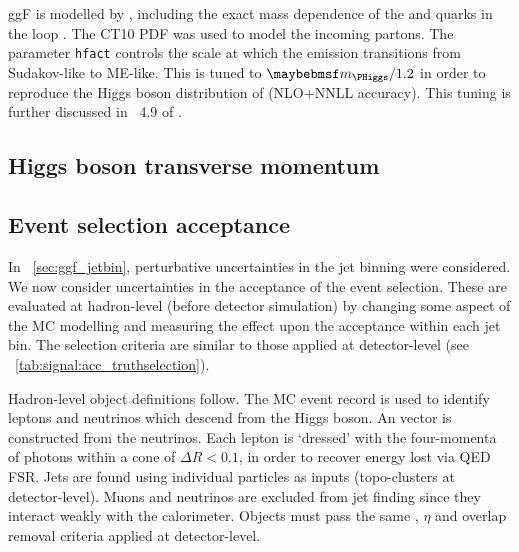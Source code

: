 
ggF is modelled by , including the exact mass 
dependence of the \Ptop and \Pbottom quarks in the loop \cite{Powheg-ggF-quarkmasses}. 
The CT10 PDF \cite{CTEQ} was used to model the incoming partons.
The \powhegbox parameter \verb|hfact| controls the scale at which the emission 
transitions from Sudakov-like to ME-like. This is tuned to $\mH/1.2$ in order to 
reproduce the Higgs boson \pt distribution of \hqt \cite{HqT2} (NLO+NNLL accuracy). This 
tuning is further discussed in \Section~4.9 of \Reference \cite{YR2}.



\subsection{Higgs boson transverse momentum}



\subsection{Event selection acceptance}

In \Section~\ref{sec:ggf_jetbin}, perturbative uncertainties in the jet binning were 
considered. We now consider uncertainties in the acceptance of the event selection. These 
are evaluated at hadron-level (\ie before detector simulation) by changing some aspect of 
the MC modelling and measuring the effect upon the acceptance within each jet bin. 
The selection criteria are similar to those applied at detector-level (see 
\Table~\ref{tab:signal:acc_truthselection}).

Hadron-level object definitions follow. The MC event record is used to identify leptons 
and neutrinos which descend from the Higgs boson. An \metvec vector is constructed from 
the neutrinos. Each lepton is `dressed' with the four-momenta of photons within a cone of 
$\Delta R < 0.1$, in order to recover energy lost via QED FSR. Jets are found using 
individual particles as inputs (\cf topo-clusters at detector-level). Muons and neutrinos 
are excluded from jet finding since they interact weakly with the calorimeter. Objects 
must pass the same \pt, $\eta$ and overlap removal criteria applied at detector-level.


